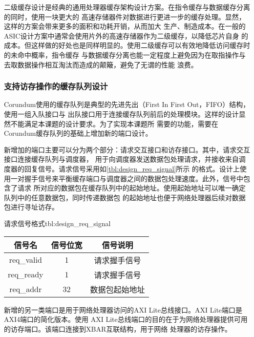 
二级缓存设计是经典的通用处理器缓存架构设计方案。在指令缓存与数据缓存分离的同时，使用一块更大的
高速存储器件对数据进行更进一步的缓存处理。显然，这样的方案会带来更多的面积和功耗开销，从而加大
生产、制造成本。在一般的ASIC设计方案中通常会使用片外的高速存储器作为二级缓存，以降低芯片自身
的成本。但这样做的好处也是同样明显的。使用二级缓存可以有效地降低访问缓存时的未命中概率，指令缓存
与数据缓存分离也能一定程度上避免因为在取指操作与去取数据操作相互淘汰而造成的颠簸，避免了无谓的性能
浪费。

\subsubsection{支持访存操作的缓存队列设计}

Corundum使用的缓存队列是典型的先进先出（First In First Out，FIFO）结构，使用一组入队接口与
出队接口用于连接缓存队列前后的处理模块。这样的设计显然不能满足本课题的设计要求。为了实现本课题所
需要的功能，需要在Corundum缓存队列的基础上增加新的端口设计。

新增加的端口主要可以分为两个部分：请求交互接口和访存接口。其中，请求交互接口连接缓存队列与调度器，
用于向调度器发送数据包处理请求，并接收来自调度器的回复信号。请求信号采用如\autoref{tbl:design_req_signal}所示
的格式。设计上使用一对握手信号来平衡缓存端口与调度器之间的数据包处理速度。此外，信号中包含了请求
所对应的数据包在缓存队列中的起始地址。使用起始地址可以唯一确定队列中的任意数据包，同时传递数据包
的起始地址也便于网络处理器后续对数据包进行寻址访存。

\begin{generaltab}{请求信号格式}{tbl:design_req_signal}
  \begin{tabular}{ccc}
    \toprule
    信号名 & 信号位宽 & 信号说明 \\
    \midrule
    req\_valid & 1 & 请求握手信号 \\
    req\_ready & 1 & 请求握手信号 \\
    req\_addr & 32 & 数据包起始地址 \\
    \bottomrule
  \end{tabular}
\end{generaltab}

新增的另一类端口是用于网络处理器访问的AXI Lite总线接口。AXI Lite端口是AXI4端口的简化版本\cite{intro_amba_axi}。使用
AXI Lite总线端口的目的在于为网络处理器提供可用的访存端口。该端口连接到XBAR互联结构，用于网络
处理器的访存操作。

